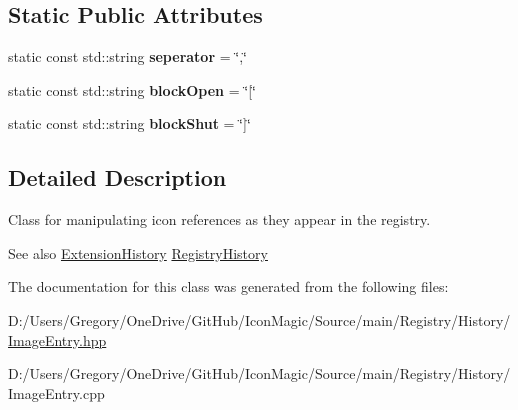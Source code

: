 \subsection*{Static Public Attributes}
\begin{DoxyCompactItemize}
\item 
\hypertarget{class_image_entry_ad4a7cf6088ced1381d05d3f1fcb7ba92}{}static const std\+::string {\bfseries seperator} = \char`\"{},\char`\"{}\label{class_image_entry_ad4a7cf6088ced1381d05d3f1fcb7ba92}

\item 
\hypertarget{class_image_entry_aad3911ab2c1a76a434c649344ed00394}{}static const std\+::string {\bfseries block\+Open} = \char`\"{}\mbox{[}\char`\"{}\label{class_image_entry_aad3911ab2c1a76a434c649344ed00394}

\item 
\hypertarget{class_image_entry_a3b9e7171180470a60857f679fe34dc58}{}static const std\+::string {\bfseries block\+Shut} = \char`\"{}\mbox{]}\char`\"{}\label{class_image_entry_a3b9e7171180470a60857f679fe34dc58}

\end{DoxyCompactItemize}


\subsection{Detailed Description}
Class for manipulating icon references as they appear in the registry. 

\begin{DoxySeeAlso}{See also}
\hyperlink{class_extension_history}{Extension\+History} \hyperlink{class_registry_history}{Registry\+History} 
\end{DoxySeeAlso}


The documentation for this class was generated from the following files\+:\begin{DoxyCompactItemize}
\item 
D\+:/\+Users/\+Gregory/\+One\+Drive/\+Git\+Hub/\+Icon\+Magic/\+Source/main/\+Registry/\+History/\hyperlink{_image_entry_8hpp}{Image\+Entry.\+hpp}\item 
D\+:/\+Users/\+Gregory/\+One\+Drive/\+Git\+Hub/\+Icon\+Magic/\+Source/main/\+Registry/\+History/Image\+Entry.\+cpp\end{DoxyCompactItemize}
